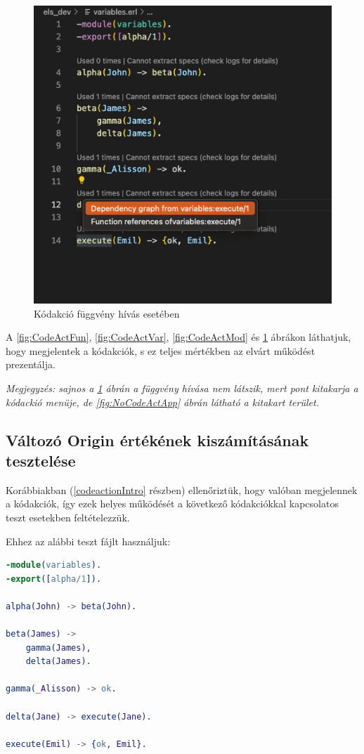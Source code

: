 \begin{figure}[H]
  \centering
  \includegraphics[width=0.7\linewidth]{images/testCases/CodeActApp.png}
  \caption{Kódakció függvény hívás esetében}
  \label{fig:CodeActApp}
\end{figure}

A \ref{fig:CodeActFun}, \ref{fig:CodeActVar}, \ref{fig:CodeActMod} és \ref{fig:CodeActApp} ábrákon láthatjuk, hogy megjelentek a kódakciók, s ez teljes mértékben az elvárt működést prezentálja. 

\textit{Megjegyzés: sajnos a \ref{fig:CodeActApp} ábrán a \lstset{execute} függvény hívása nem látszik, mert pont kitakarja a kódackió menüje, de \ref{fig:NoCodeActApp} ábrán látható a kitakart terület. }



\subsection{Változó Origin értékének kiszámításának tesztelése}

Korábbiakban (\ref{codeactionIntro} részben) ellenőriztük, hogy valóban megjelennek a kódakciók, így ezek helyes működését a következő kódakciókkal kapcsolatos teszt esetekben feltételezzük.

\noindent Ehhez az alábbi teszt fájlt használjuk:

 \label{testVariablesERL}
\begin{lstlisting}[language={erlang}]  
-module(variables).
-export([alpha/1]).

alpha(John) -> beta(John).

beta(James) -> 
    gamma(James), 
    delta(James).

gamma(_Alisson) -> ok.

delta(Jane) -> execute(Jane).

execute(Emil) -> {ok, Emil}.
\end{lstlisting}

